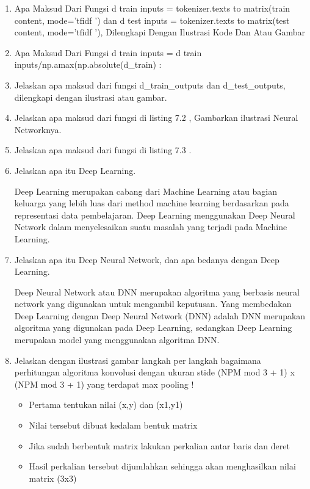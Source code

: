 \begin{enumerate}
\item  Apa Maksud Dari Fungsi d train inputs = tokenizer.texts to matrix(train content, mode=’tfidf ’) dan d test inputs = tokenizer.texts to matrix(test content, mode=’tfidf ’), Dilengkapi Dengan Ilustrasi Kode Dan Atau Gambar

\item Apa Maksud Dari Fungsi d train inputs = d train inputs/np.amax(np.absolute(d\_train) :

\item Jelaskan apa maksud dari fungsi d\_train\_outputs dan d\_test\_outputs, dilengkapi dengan ilustrasi atau gambar.

\item Jelaskan apa maksud dari fungsi di listing 7.2 , Gambarkan ilustrasi Neural Networknya.

\item Jelaskan apa maksud dari fungsi di listing 7.3 .

\item Jelaskan apa itu Deep Learning.
	\par Deep Learning merupakan cabang dari Machine Learning atau bagian keluarga yang lebih luas dari method machine learning berdasarkan pada representasi data pembelajaran. Deep Learning menggunakan Deep Neural Network dalam menyelesaikan suatu masalah yang terjadi pada Machine Learning.

\item Jelaskan apa itu Deep Neural Network, dan apa bedanya dengan Deep Learning.
	\par Deep Neural Network atau DNN merupakan algoritma yang berbasis neural network yang digunakan untuk mengambil keputusan. Yang membedakan Deep Learning dengan  Deep Neural Network (DNN) adalah DNN merupakan algoritma yang digunakan pada Deep Learning, sedangkan Deep Learning merupakan model yang menggunakan algoritma DNN.

\item Jelaskan dengan ilustrasi gambar langkah per langkah bagaimana perhitungan algoritma konvolusi dengan ukuran stide (NPM mod 3 + 1) x (NPM mod 3 + 1) yang terdapat max pooling !

	\begin{itemize}
		\item Pertama tentukan nilai (x,y) dan (x1,y1)
		\item Nilai tersebut dibuat kedalam bentuk matrix
		\item Jika sudah berbentuk matrix lakukan perkalian antar baris dan deret
		\item Hasil perkalian tersebut dijumlahkan sehingga akan menghasilkan nilai matrix (3x3)
	\end{itemize}


\end{enumerate}

